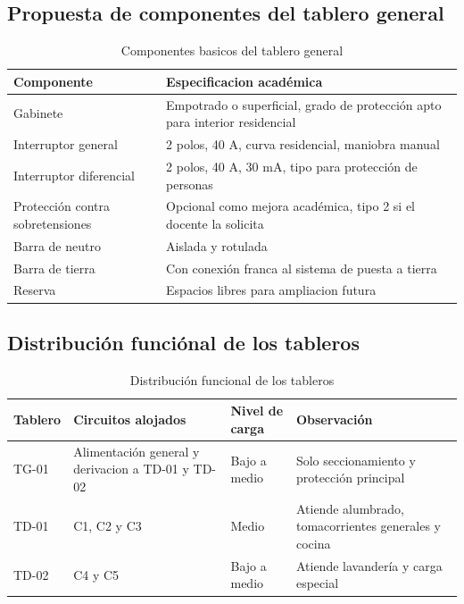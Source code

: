 \subsection{Propuesta de componentes del tablero general}

\begin{table}[H]
\centering
\small
\caption{Componentes basicos del tablero general}
\label{tab:componentes-tablero}
\begin{tabularx}{\textwidth}{L{3.4cm}Y}
\toprule
\textbf{Componente} & \textbf{Especificacion académica} \\
\midrule
Gabinete & Empotrado o superficial, grado de protección apto para interior residencial \\
Interruptor general & 2 polos, 40 A, curva residencial, maniobra manual \\
Interruptor diferencial & 2 polos, 40 A, 30 mA, tipo para protección de personas \\
Protección contra sobretensiones & Opcional como mejora académica, tipo 2 si el docente la solicita \\
Barra de neutro & Aislada y rotulada \\
Barra de tierra & Con conexión franca al sistema de puesta a tierra \\
Reserva & Espacios libres para ampliacion futura \\
\bottomrule
\end{tabularx}
\end{table}

\subsection{Distribución funciónal de los tableros}

\begin{table}[H]
\centering
\small
\caption{Distribución funcional de los tableros}
\label{tab:funcion-tableros}
\begin{tabularx}{\textwidth}{L{1.7cm}L{3.5cm}L{2.6cm}Y}
\toprule
\textbf{Tablero} & \textbf{Circuitos alojados} & \textbf{Nivel de carga} & \textbf{Observación} \\
\midrule
TG-01 & Alimentación general y derivacion a TD-01 y TD-02 & Bajo a medio & Solo seccionamiento y protección principal \\
TD-01 & C1, C2 y C3 & Medio & Atiende alumbrado, tomacorrientes generales y cocina \\
TD-02 & C4 y C5 & Bajo a medio & Atiende lavandería y carga especial \\
\bottomrule
\end{tabularx}
\end{table}


